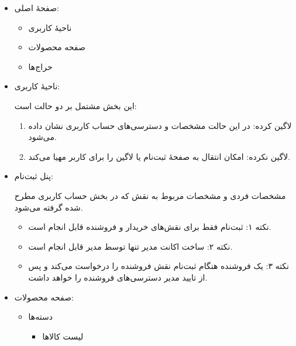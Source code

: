\documentclass[]{article}
\begin{document}
\begin{itemize}

\item
صفحهٔ اصلی:

\begin{itemize}

\item
ناحیهٔ کاربری

\item
صفحه محصولات

\item
حراج‌ها

\end{itemize}

\item
ناحیهٔ‌ کاربری:

این بخش مشتمل بر دو حالت است:

\begin{enumerate}

\item
لاگین کرده: در این حالت مشخصات و دسترسی‌های حساب کاربری نشان داده می‌شود.

\item
لاگین نکرده: امکان انتقال به صفحهٔ ثبت‌نام یا لاگین را برای کاربر مهیا می‌کند.
\end{enumerate}

\newpage
\item
پنل ثبت‌نام:

مشخصات فردی و مشخصات مربوط به نقش که در بخش حساب کاربری مطرح شده گرفته می‌شود.

\begin{itemize}[label={$\blacksquare$}]
\item
نکته ۱: ثبت‌نام فقط برای نقش‌های خریدار و فروشنده قابل انجام است.

\item
نکته ۲: ساخت اکانت مدیر تنها توسط مدیر قابل انجام است.

\item
نکته ۳: یک فروشنده هنگام ثبت‌نام نقش فروشنده را درخواست می‌کند و پس از تایید مدیر دسترسی‌های فروشنده را خواهد داشت.

\end{itemize}

\item
صفحه محصولات:

\begin{itemize}
\item
دسته‌‌ها 

\begin{itemize}[label={$\blacksquare$}]
\item
لیست کالاها


\end{itemize}
\end{itemize}
\end{itemize}
\end{document}
